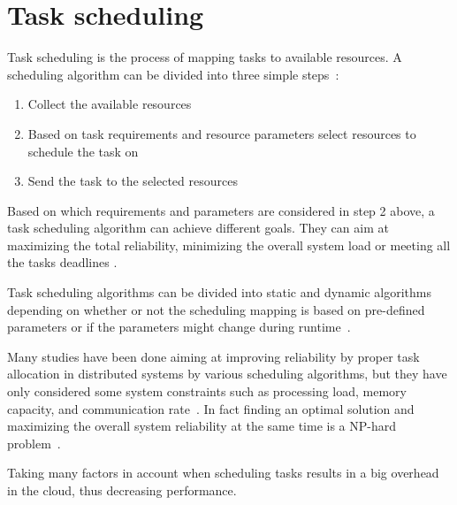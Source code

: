 \documentclass{cslthse-msc}
\begin{document}
\fi

\section{Task scheduling} \label{sec:background_task_sched}
Task scheduling is the process of mapping tasks to available resources. A scheduling algorithm can be divided into three simple steps~\cite{optSchedCloud}:

\begin{enumerate}
	\item Collect the available resources
	\item Based on task requirements and resource parameters select resources to schedule the task on
	\item Send the task to the selected resources
\end{enumerate}

Based on which requirements and parameters are considered in step 2 above, a task scheduling algorithm can achieve different goals. They can aim at maximizing the total reliability, minimizing the overall system load or meeting all the tasks deadlines \cite{schedulingSurvey}. 

Task scheduling algorithms can be divided into static and dynamic algorithms depending on whether or not the scheduling mapping is based on pre-defined parameters or if the parameters might change during runtime~\cite{schedReplicas}.

Many studies have been done aiming at improving reliability by proper task allocation in distributed systems by various scheduling algorithms, but they have only considered some system constraints such as processing load, memory capacity, and communication rate~\cite{optTaskAllocationForMaxRel}. In fact finding an optimal solution and maximizing the overall system reliability at the same time is a NP-hard problem~\cite{optTaskAllocationForMaxRel, taskAllocationSwarm, schedulingSurvey}.

Taking many factors in account when scheduling tasks results in a big overhead in the cloud, thus decreasing performance. 

\end{document}
